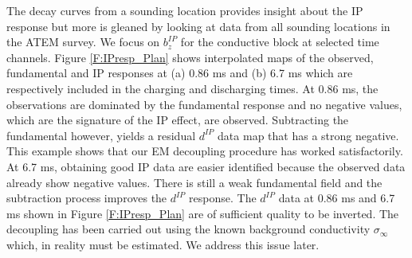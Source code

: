 \documentclass[a4paper, 11pt]{article}
\newcommand{\siginf}{\sigma_\infty}
\newcommand{\dip}{d^{IP}}
\begin{document}
The decay curves from a sounding location  provides insight about the IP response but more is gleaned by looking at data from all  sounding locations in the ATEM survey. We focus on $b_z^{IP}$ for the conductive block at selected time channels. Figure \ref{F:IPresp_Plan} shows interpolated maps of the observed, fundamental and IP responses at (a) 0.86 ms and (b) 6.7 ms which are respectively included in the charging and discharging times. 
At 0.86 ms, the observations are dominated by the fundamental response and no negative values,  which are the signature of the IP effect, are observed. Subtracting the fundamental however, yields a residual $\dip$ data map that has a strong negative. This  example  shows that our EM decoupling procedure has worked satisfactorily.  At 6.7 ms, obtaining good IP data are easier identified because the observed data already show negative values. There is still a weak fundamental field and the subtraction process improves the $\dip$ response. The $\dip$ data at  0.86 ms and 6.7 ms shown in Figure \ref{F:IPresp_Plan} are of sufficient quality to be inverted. The decoupling has been carried out using the known background conductivity $\siginf$ which, in reality must be estimated. We address this issue later. 
\end{document}
